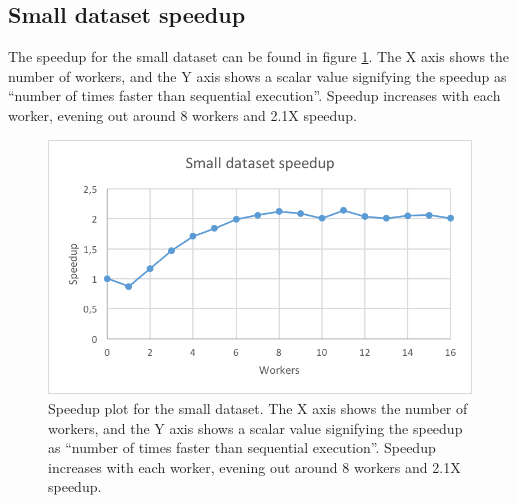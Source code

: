 \subsection{Small dataset speedup}
The speedup for the small dataset can be found in figure \ref{fig:dataset_2_speedup}.
The X axis shows the number of workers, and the Y axis shows a scalar value signifying the speedup as
``number of times faster than sequential execution''. Speedup increases with each worker, evening out around 8 workers and 2.1X speedup.
\begin{figure}[ht]
  \centering
  \includegraphics[width=120mm]{figures/dataset_2/dataset_2_speedup.png}
  \caption[Speedup plot for the small dataset.]{Speedup plot for the small dataset. The X axis shows the number of workers, and the Y axis shows a scalar value signifying the speedup as
  ``number of times faster than sequential execution''. Speedup increases with each worker, evening out around 8 workers and 2.1X speedup.}
  \label{fig:dataset_2_speedup}
\end{figure}

